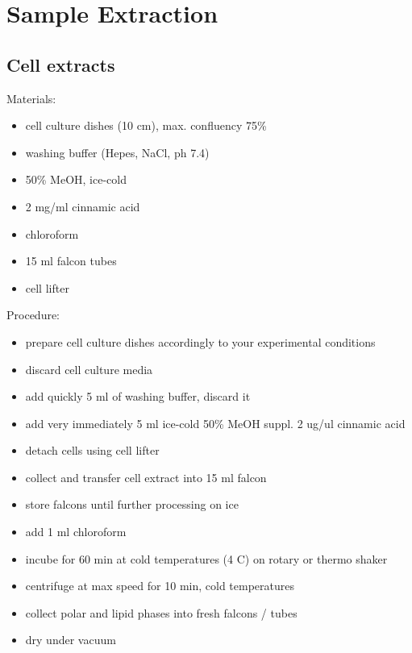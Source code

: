 \documentclass[]{book}
\providecommand{\tightlist}{%
  \setlength{\itemsep}{0pt}\setlength{\parskip}{0pt}}
\begin{document}
\hypertarget{SampleExtraction}{%
\section{Sample Extraction}\label{SampleExtraction}}

\hypertarget{cell-extracts}{%
\subsection{Cell extracts}\label{cell-extracts}}

Materials:

\begin{itemize}
\tightlist
\item
  cell culture dishes (10 cm), max. confluency 75\%
\item
  washing buffer (Hepes, NaCl, ph 7.4)
\item
  50\% MeOH, ice-cold
\item
  2 mg/ml cinnamic acid
\item
  chloroform
\item
  15 ml falcon tubes
\item
  cell lifter
\end{itemize}

Procedure:

\begin{itemize}
\tightlist
\item
  prepare cell culture dishes accordingly to your experimental conditions
\item
  discard cell culture media
\item
  add quickly 5 ml of washing buffer, discard it
\item
  add very immediately 5 ml ice-cold 50\% MeOH suppl. 2 ug/ul cinnamic acid
\item
  detach cells using cell lifter
\item
  collect and transfer cell extract into 15 ml falcon
\item
  store falcons until further processing on ice
\item
  add 1 ml chloroform
\item
  incube for 60 min at cold temperatures (4 C) on rotary or thermo shaker
\item
  centrifuge at max speed for 10 min, cold temperatures
\item
  collect polar and lipid phases into fresh falcons / tubes
\item
  dry under vacuum
\end{itemize}
\end{document}
